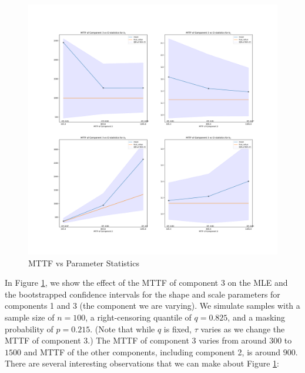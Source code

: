 \documentclass[
]{article}
\begin{document}
\begin{figure}

{\centering \includegraphics{image/plot-scale3-vs-stats} 

}

\caption{MTTF vs Parameter Statistics}\label{fig:mttf-vs-ci}
\end{figure}

In Figure \ref{fig:mttf-vs-ci}, we show the effect of the MTTF of
component 3 on the MLE and the bootstrapped confidence intervals for the
shape and scale parameters for components 1 and 3 (the component we are
varying). We simulate samples with a sample size of \(n = 100\), a
right-censoring quantile of \(q = 0.825\), and a masking probability of
\(p = 0.215\). (Note that while \(q\) is fixed, \(\tau\) varies as we
change the MTTF of component 3.) The MTTF of component 3 varies from
around \(300\) to \(1500\) and MTTF of the other components, including
component 2, is around \(900\). There are several interesting
observations that we can make about Figure \ref{fig:mttf-vs-ci}:
\end{document}
